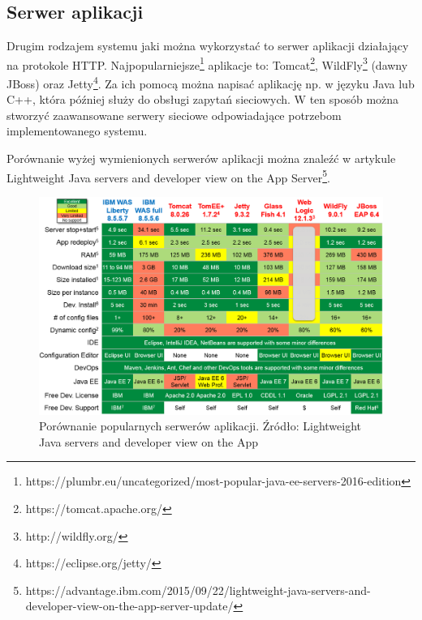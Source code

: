 \documentclass[eng]{mgr}
\begin{document}
			\subsection{Serwer aplikacji}
			Drugim rodzajem systemu jaki można wykorzystać to serwer aplikacji działający na protokole HTTP. Najpopularniejsze\footnote{https://plumbr.eu/uncategorized/most-popular-java-ee-servers-2016-edition} aplikacje to: Tomcat\footnote{https://tomcat.apache.org/}, WildFly\footnote{http://wildfly.org/} (dawny JBoss) oraz Jetty\footnote{https://eclipse.org/jetty/}. Za ich pomocą można napisać aplikację np. w języku Java lub C++, która później służy do obsługi zapytań sieciowych. W ten sposób można stworzyć zaawansowane serwery sieciowe odpowiadające potrzebom implementowanego systemu.
		
			Porównanie wyżej wymienionych serwerów aplikacji można znaleźć w artykule Lightweight Java servers and developer view on the App Server\footnote{https://advantage.ibm.com/2015/09/22/lightweight-java-servers-and-developer-view-on-the-app-server-update/}.
		
			\begin{center}
				\begin{figure}[ht]
					\centering
					\includegraphics[scale=0.55]{weblogic-jboss-wildfly-websphere-liberty-tomee-tomcat-glassfish-comparison1.png}
					\caption{Porównanie popularnych serwerów aplikacji. Źródło: Lightweight Java servers and developer view on the App}
				\end{figure}
			\end{center}
		
\end{document}
